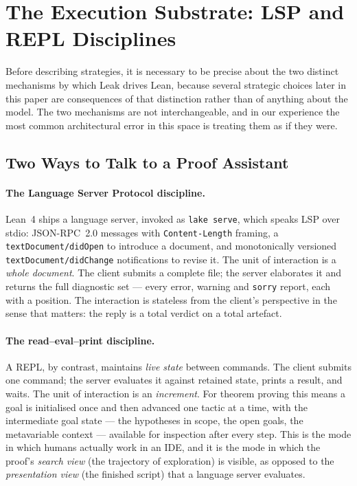 \documentclass[12pt, a4paper]{article}
\begin{document}
\section{The Execution Substrate: LSP and REPL Disciplines}
\label{sec:substrate}

Before describing strategies, it is necessary to be precise about the two
distinct mechanisms by which Leak drives Lean, because several strategic
choices later in this paper are consequences of that distinction rather than
of anything about the model. The two mechanisms are not interchangeable, and
in our experience the most common architectural error in this space is
treating them as if they were.

\subsection{Two Ways to Talk to a Proof Assistant}

\paragraph{The Language Server Protocol discipline.} Lean~4 ships a language
server, invoked as \texttt{lake serve}, which speaks LSP over stdio:
JSON-RPC~2.0 messages with \texttt{Content-Length} framing, a
\texttt{textDocument/didOpen} to introduce a document, and monotonically
versioned \texttt{textDocument/didChange} notifications to revise it. The
unit of interaction is a \emph{whole document}. The client submits a
complete file; the server elaborates it and returns the full diagnostic set
--- every error, warning and \texttt{sorry} report, each with a position.
The interaction is stateless from the client's perspective in the sense that
matters: the reply is a total verdict on a total artefact.

\paragraph{The read--eval--print discipline.} A REPL, by contrast, maintains
\emph{live state} between commands. The client submits one command; the
server evaluates it against retained state, prints a result, and waits. The
unit of interaction is an \emph{increment}. For theorem proving this means a
goal is initialised once and then advanced one tactic at a time, with the
intermediate goal state --- the hypotheses in scope, the open goals, the
metavariable context --- available for inspection after every step. This is
the mode in which humans actually work in an IDE, and it is the mode in
which the proof's \emph{search view} (the trajectory of exploration) is
visible, as opposed to the \emph{presentation view} (the finished script)
that a language server evaluates.
\end{document}
